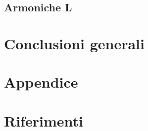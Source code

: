 \documentclass[journal]{IEEEtran}
\begin{document}
\subsection{Armoniche L}

\section{Conclusioni generali} %


\section{Appendice}


\section{Riferimenti}

\printbibliography
\end{document}
